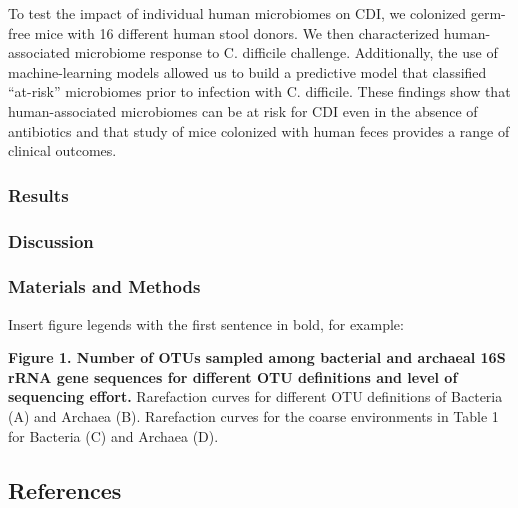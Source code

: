 \documentclass[11pt,]{article}
\begin{document}
To test the impact of individual human microbiomes on CDI, we colonized
germ-free mice with 16 different human stool donors. We then
characterized human-associated microbiome response to C. difficile
challenge. Additionally, the use of machine-learning models allowed us
to build a predictive model that classified ``at-risk'' microbiomes
prior to infection with C. difficile. These findings show that
human-associated microbiomes can be at risk for CDI even in the absence
of antibiotics and that study of mice colonized with human feces
provides a range of clinical outcomes.

\subsubsection{Results}\label{results}

\subsubsection{Discussion}\label{discussion}

\subsubsection{Materials and Methods}\label{materials-and-methods}

\newpage

Insert figure legends with the first sentence in bold, for example:

\textbf{Figure 1. Number of OTUs sampled among bacterial and archaeal
16S rRNA gene sequences for different OTU definitions and level of
sequencing effort.} Rarefaction curves for different OTU definitions of
Bacteria (A) and Archaea (B). Rarefaction curves for the coarse
environments in Table 1 for Bacteria (C) and Archaea (D).

\newpage

\subsection*{References}\label{references}
\end{document}
